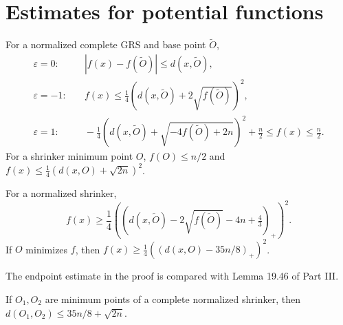 \section{Estimates for potential functions}

\begin{corollary}
\label{cor:chow-iv-potential-bounds}


For a normalized complete GRS and base point $\widetilde O$,
\begin{align*}
\varepsilon=0:&\quad |f(x)-f(\widetilde O)|\le d(x,\widetilde O),\\
\varepsilon=-1:&\quad f(x)\le\tfrac14(d(x,\widetilde O)+2\sqrt{f(\widetilde O)})^2,\\
\varepsilon=1:&\quad -\tfrac14(d(x,\widetilde O)+\sqrt{-4f(\widetilde O)+2n})^2+\tfrac n2
\le f(x)\le\tfrac n2.
\end{align*}
For a shrinker minimum point $O$, $f(O)\le n/2$ and
$f(x)\le\frac14(d(x,O)+\sqrt{2n})^2$.
\end{corollary}

\begin{theorem}
\label{thm:chow-iv-potential-lower-bound}


For a normalized shrinker,
\[
f(x)\ge\frac14\left((d(x,\widetilde O)-2\sqrt{f(\widetilde O)}-4n+\tfrac43)_+\right)^2.
\]
If $O$ minimizes $f$, then
$f(x)\ge\frac14((d(x,O)-35n/8)_+)^2$.
\end{theorem}

\begin{remark}
\label{rem:chow-iv-potential-part-iii-comparison}

The endpoint estimate in the proof is compared with Lemma 19.46 of Part III.
\end{remark}

\begin{corollary}
\label{cor:chow-iv-potential-minima-distance}


If $O_1,O_2$ are minimum points of a complete normalized shrinker, then
$d(O_1,O_2)\le35n/8+\sqrt{2n}$.
\end{corollary}

